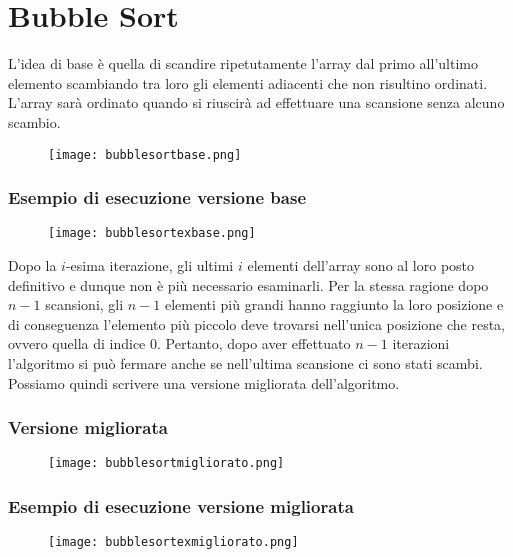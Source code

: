 \section{Bubble Sort}
L'idea di base è quella di scandire ripetutamente l'array dal primo all'ultimo
elemento scambiando tra loro gli elementi adiacenti che non risultino ordinati.
L'array sarà ordinato quando si riuscirà ad effettuare una scansione senza alcuno
scambio.

\begin{figure}[h]
    \texttt{[image: bubblesortbase.png]}
\end{figure}

\subsubsection*{Esempio di esecuzione versione base}

\begin{figure}[h]
    \texttt{[image: bubblesortexbase.png]}
\end{figure}

\noindent Dopo la $i$-esima iterazione, gli ultimi $i$ elementi dell'array sono 
al loro posto definitivo e dunque non è più necessario esaminarli. Per la 
stessa ragione dopo $n - 1$ scansioni, gli $n - 1$ elementi più grandi hanno 
raggiunto la loro posizione e di conseguenza l'elemento più piccolo deve trovarsi
nell'unica posizione che resta, ovvero quella di indice 0. Pertanto, dopo
aver effettuato $n - 1$ iterazioni l'algoritmo si può fermare anche se 
nell'ultima scansione ci sono stati scambi. Possiamo quindi scrivere una versione migliorata 
dell'algoritmo.
\clearpage

\subsubsection*{Versione migliorata}
\begin{figure}[h]
    \texttt{[image: bubblesortmigliorato.png]}
\end{figure}

\subsubsection*{Esempio di esecuzione versione migliorata}
\begin{figure}[h]
        \texttt{[image: bubblesortexmigliorato.png]}
\end{figure}

